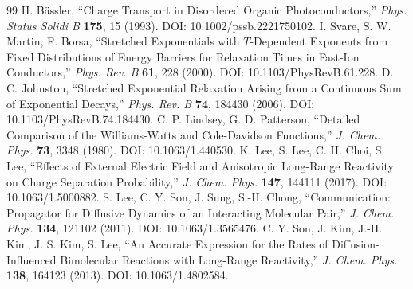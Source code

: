 \documentclass[11pt,a4paper]{article}
\begin{document}
\begin{thebibliography}{99}
 H. B\"assler, ``Charge Transport in Disordered Organic Photoconductors,'' \emph{Phys. Status Solidi B} \textbf{175}, 15 (1993). DOI: 10.1002/pssb.2221750102.
 I. Svare, S. W. Martin, F. Borsa, ``Stretched Exponentials with $T$-Dependent Exponents from Fixed Distributions of Energy Barriers for Relaxation Times in Fast-Ion Conductors,'' \emph{Phys. Rev. B} \textbf{61}, 228 (2000). DOI: 10.1103/PhysRevB.61.228.
 D. C. Johnston, ``Stretched Exponential Relaxation Arising from a Continuous Sum of Exponential Decays,'' \emph{Phys. Rev. B} \textbf{74}, 184430 (2006). DOI: 10.1103/PhysRevB.74.184430.
 C. P. Lindsey, G. D. Patterson, ``Detailed Comparison of the Williams-Watts and Cole-Davidson Functions,'' \emph{J. Chem. Phys.} \textbf{73}, 3348 (1980). DOI: 10.1063/1.440530.
 K. Lee, S. Lee, C. H. Choi, S. Lee, ``Effects of External Electric Field and Anisotropic Long-Range Reactivity on Charge Separation Probability,'' \emph{J. Chem. Phys.} \textbf{147}, 144111 (2017). DOI: 10.1063/1.5000882.
 S. Lee, C. Y. Son, J. Sung, S.-H. Chong, ``Communication: Propagator for Diffusive Dynamics of an Interacting Molecular Pair,'' \emph{J. Chem. Phys.} \textbf{134}, 121102 (2011). DOI: 10.1063/1.3565476.
 C. Y. Son, J. Kim, J.-H. Kim, J. S. Kim, S. Lee, ``An Accurate Expression for the Rates of Diffusion-Influenced Bimolecular Reactions with Long-Range Reactivity,'' \emph{J. Chem. Phys.} \textbf{138}, 164123 (2013). DOI: 10.1063/1.4802584.
\end{thebibliography}
\end{document}
